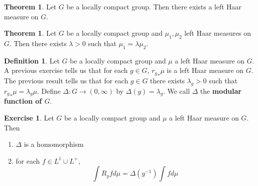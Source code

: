 \documentclass[12pt]{amsart}
\theoremstyle{definition}
\newtheorem{defn}[definition]{Definition}
\newtheorem{thm}[definition]{Theorem}
\newtheorem{ex}[definition]{Exercise}
\newcommand{\Del}{\Delta}
\newcommand{\lam}{\lambda}
\begin{document}
	\begin{thm}
		Let $G$ be a locally compact group. Then there exists a left Haar measure on $G$. 
	\end{thm}
	
	\begin{thm}
		Let $G$ be a locally compact group and $\mu_1, \mu_2$ left Haar measures on $G$. Then there exists $\lam > 0$ such that $\mu_1 = \lam \mu_2 $.
	\end{thm}
	
	\begin{defn}
		Let $G$ be a locally compact group and $\mu$ a left Haar measure on $G$. A previous exercise tells us that for each $g \in G$, ${r_g}_*\mu$ is a left Haar measure on $G$. The previous result tells us that for each $g \in G$ there exists $\lam_g >0$ such that ${r_g}_*\mu = \lam_g \mu$. Define $\Del: G \rightarrow (0, \infty)$ by $\Del(g) = \lam_g$. We call $\Del$ the \textbf{modular function of $G$}. 
	\end{defn}

	\begin{ex}
		Let $G$ be a locally compact group and $\mu$ a left Haar measure on $G$. Then 
		\begin{enumerate}
			\item $\Del $ is a homomorphism 
			\item for each $f \in L^1 \cup L^+$, $$\int R_y f d \mu = \Del(y^{-1}) \int f d \mu$$
		\end{enumerate}
	\end{ex}
\end{document}
